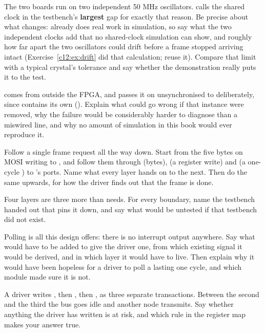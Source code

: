  The two boards run on two independent 50 MHz oscillators.  calls the
shared clock in  the testbench's \textbf{largest} gap for exactly that reason.
Be precise about what changes:  already does real work in simulation, so say
what the two independent clocks add that no shared-clock simulation can show, and roughly how far
apart the two oscillators could drift before a frame stopped arriving intact
(Exercise~\ref{c12:ex:drift} did that calculation; reuse it). Compare that limit with a typical
crystal's tolerance and say whether the demonstration really puts it to the test.

  comes from outside the FPGA, and  passes it on
unsynchronised to  deliberately, since  contains its own
 (). Explain what could go wrong if that instance were removed, why
the failure would be considerably harder to diagnose than a miswired line, and why no amount of
simulation in this book would ever reproduce it.

\label{c19:ex:endtoend}
 Follow a single frame request all the way down. Start from the five bytes on MOSI writing
 to , and follow them through  (bytes),
 (a register write) and  (a one-cycle ) to
's ports. Name what every layer hands on to the next. Then do the same upwards,
for how the driver finds out that the frame is done.

 Four layers are three more than  needs. For every boundary, name the
testbench handed out that pins it down, and say what would be untested if that testbench did not
exist.

 Polling is all this design offers: there is no interrupt output anywhere. Say what would
have to be added to give the driver one, from which existing signal it would be derived, and in which
layer it would have to live. Then explain why it would have been hopeless for a driver to poll a
 lasting one cycle, and which module made sure it is not.

 A driver writes , then , then , as three separate
transactions. Between the second and the third the bus goes idle and another node transmits. Say
whether anything the driver has written is at risk, and which rule in the register map makes your
answer true.

